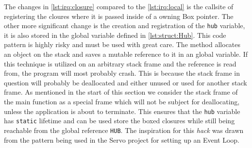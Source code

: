 The changes in \autoref{lst:irq:closure} compared to the \autoref{lst:irq:local} is the callsite of registering the cloures where it is passed inside of a owning Box pointer. 
The other more significant change is the creation and registration of the \texttt{hub} variable, it is also stored in the global variable defined in \autoref{lst:struct:Hub}.
This code pattern is highly risky and must be used with great care.
The method allocates an object on the stack and saves a mutable reference to it in an global variable.
If this technique is utilized on an arbitrary stack frame and the reference is read from, the program will most probably crash.
This is because the stack frame in question will probably be deallocated and either unused or used for another stack frame.
As mentioned in the start of this section we consider the stack frame of the main function as a special frame which will not be subject for deallocating, unless the application is about to terminate.
This ensures that the \texttt{hub} variable has \texttt{static} lifetime and can be used store the boxed closures while still being reachable from the global reference \texttt{HUB}.
The inspiration for this \textit{hack} was drawn from the pattern being used in the Servo project for setting up an Event Loop.
